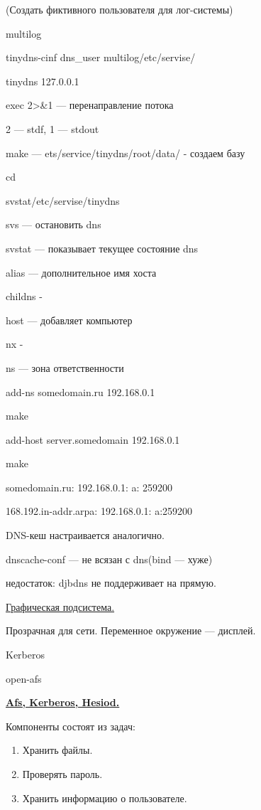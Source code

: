 \par 
(Создать фиктивного пользователя для
лог-системы) 

\par 
multilog
\par 
tinydns-cinf dns\_user multilog/etc/servise/
\par 
tinydns 127.0.0.1
\par 
exec 2>\&1 — перенаправление потока
\par 
2 — stdf, 1 — stdout
\par 
make — ets/service/tinydns/root/data/ - создаем базу
\par 
cd
\par 
svstat/etc/servise/tinydns
\par 
svs — остановить dns
\par 
svstat — показывает текущее состояние dns
\par 
alias — дополнительное имя хоста
\par 
childns -
\par 
host — добавляет компьютер
\par 
nx -
\par 
ns — зона ответственности
\par 
add-ns somedomain.ru 192.168.0.1 

\par 
make
\par 
add-host server.somedomain 192.168.0.1 

\par 
make
\par 
somedomain.ru: 192.168.0.1: a: 259200
\par 
168.192.in-addr.arpa: 192.168.0.1: a:259200
\par 
DNS-кеш настраивается аналогично.
\par 
dnscache-conf — не всязан с dns(bind — хуже)
\par 
недостаток: djbdns не поддерживает на
прямую.
\par 
\underline{Графическая подсистема.}
\par 
Прозрачная для сети. Переменное окружение
— дисплей.
\par 
Kerberos
\par 
open-afs
\par 


\par 
\underline{\textbf{Afs, Kerberos, Hesiod.}}
\par 
Компоненты состоят из задач:
\begin{enumerate}
	\item \par 
	Хранить файлы.
	\item \par 
	Проверять пароль.
	\item \par 
	Хранить информацию о пользователе.
\end{enumerate}
\par 
 

